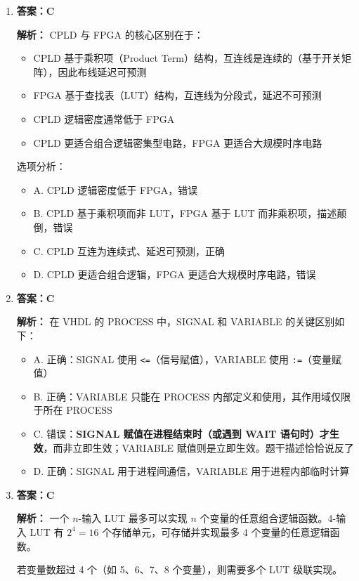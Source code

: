 \begin{enumerate}[label=\arabic*.]
\begin{itemize}
    \item A. ARCHITECTURE —— 定义实体的实现（结构体）
    \item B. PORT —— 定义实体端口的关键字 \quad \checkmark
    \item C. SIGNAL —— 声明内部信号的类型
    \item D. COMPONENT —— 声明待例化的元件
\end{itemize}

\item \textbf{答案：C}

\textbf{解析：} CPLD 与 FPGA 的核心区别在于：
\begin{itemize}
    \item CPLD 基于乘积项（Product Term）结构，互连线是连续的（基于开关矩阵），因此布线延迟可预测
    \item FPGA 基于查找表（LUT）结构，互连线为分段式，延迟不可预测
    \item CPLD 逻辑密度通常低于 FPGA
    \item CPLD 更适合组合逻辑密集型电路，FPGA 更适合大规模时序电路
\end{itemize}

选项分析：
\begin{itemize}
    \item A. CPLD 逻辑密度低于 FPGA，错误
    \item B. CPLD 基于乘积项而非 LUT，FPGA 基于 LUT 而非乘积项，描述颠倒，错误
    \item C. CPLD 互连为连续式、延迟可预测，正确 \quad \checkmark
    \item D. CPLD 更适合组合逻辑，FPGA 更适合大规模时序电路，错误
\end{itemize}

\item \textbf{答案：C}

\textbf{解析：} 在 VHDL 的 PROCESS 中，SIGNAL 和 VARIABLE 的关键区别如下：

\begin{itemize}
    \item A. 正确：SIGNAL 使用 \texttt{<=}（信号赋值），VARIABLE 使用 \texttt{:=}（变量赋值）
    \item B. 正确：VARIABLE 只能在 PROCESS 内部定义和使用，其作用域仅限于所在 PROCESS
    \item C. 错误：\textbf{SIGNAL 赋值在进程结束时（或遇到 WAIT 语句时）才生效}，而非立即生效；VARIABLE 赋值则是立即生效。题干描述恰恰说反了 \quad \checkmark
    \item D. 正确：SIGNAL 用于进程间通信，VARIABLE 用于进程内部临时计算
\end{itemize}

\item \textbf{答案：C}

\textbf{解析：} 一个 $n$-输入 LUT 最多可以实现 $n$ 个变量的任意组合逻辑函数。4-输入 LUT 有 $2^4 = 16$ 个存储单元，可存储并实现最多 4 个变量的任意逻辑函数。

若变量数超过 4 个（如 5、6、7、8 个变量），则需要多个 LUT 级联实现。

\end{enumerate}

